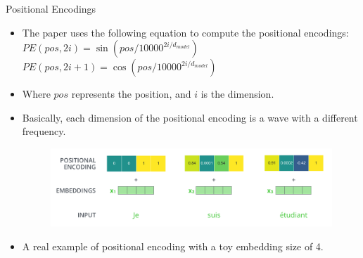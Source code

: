 \documentclass[handout]{beamer}
\begin{document}
\begin{frame}{Positional Encodings}
\begin{scriptsize}
\begin{itemize}

 \item The paper uses the following equation to compute the positional encodings: \\
 $PE(pos,2i) = \sin(pos/10000^{2i/d_{model}})$ 
  $PE(pos,2i+1) = \cos(pos/10000^{2i/d_{model}})$
 
\item Where $pos$ represents the position, and $i$ is the dimension.

\item Basically, each dimension of the positional encoding is a wave with a different frequency. 


   \begin{figure}[h]
        	\includegraphics[scale = 0.25]{pics/transformer_positional_encoding_example.png}
        \end{figure}  



\item A real example of positional encoding with a toy embedding size of 4.



\end{itemize}

\end{scriptsize}


\end{frame}
\end{document}
